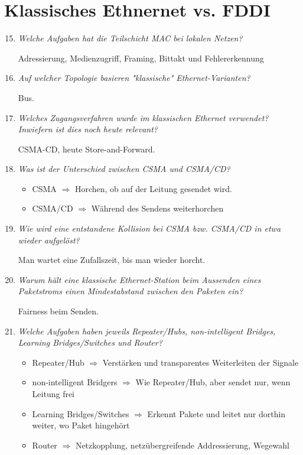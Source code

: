 \documentclass[hidelinks]{article}
\begin{document}
\section{Klassisches Ethnernet vs. FDDI}
\begin{enumerate}
\setcounter{enumi}{14}
\item \textit{Welche Aufgaben hat die Teilschicht MAC bei lokalen Netzen?}

Adressierung, Medienzugriff, Framing, Bittakt und Fehlererkennung

\item \textit{Auf welcher Topologie basieren "klassische" Ethernet-Varianten?}

Bus.

\item \textit{Welches Zugangsverfahren wurde im klassischen Ethernet verwendet? Inwiefern ist dies noch heute relevant?}

CSMA-CD, heute Store-and-Forward.

\item \textit{Was ist der Unterschied zwischen CSMA und CSMA/CD?}
\begin{itemize}
\item CSMA $\Rightarrow$ Horchen, ob auf der Leitung gesendet wird.
\item CSMA/CD $\Rightarrow$ Während des Sendens weiterhorchen
\end{itemize}

\item \textit{Wie wird eine entstandene Kollision bei CSMA bzw. CSMA/CD in etwa wieder aufgelöst?}

Man wartet eine Zufallszeit, bis man wieder horcht.

\item \textit{Warum hält eine klassische Ethernet-Station beim Aussenden eines Paketstroms einen Mindestabstand zwischen den Paketen ein?}

Fairness beim Senden.

\item \textit{Welche Aufgaben haben jeweils Repeater/Hubs, non-intelligent Bridges, Learning Bridges/Switches und Router?}
\begin{itemize}
\item Repeater/Hub $\Rightarrow$ Verstärken und transparentes Weiterleiten der Signale
\item non-intelligent Bridgers $\Rightarrow$ Wie Repeater/Hub, aber sendet nur, wenn Leitung frei
\item Learning Bridges/Switches $\Rightarrow$ Erkennt Pakete und leitet nur dorthin weiter, wo Paket hingehört
\item Router $\Rightarrow$ Netzkopplung, netzübergreifende Addressierung, Wegewahl
\end{itemize}
\end{enumerate}
\end{document}
